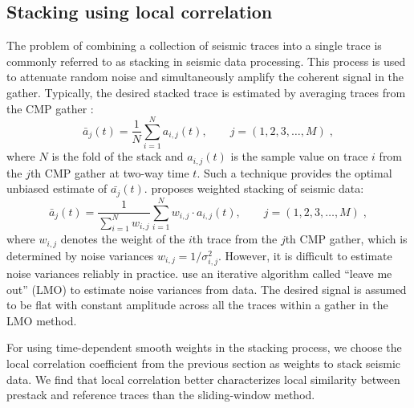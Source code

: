 \subsection{Stacking using local correlation}

The problem of combining a collection of seismic traces into a
single trace is commonly referred to as stacking in seismic data processing.
This process is used to attenuate random noise and simultaneously
amplify the coherent signal in the gather. Typically, the desired
stacked trace is estimated by averaging traces from the CMP
gather \cite[]{Mayne62}:
      \begin{equation}
          \bar{a}_j(t) = \frac{1}{N}\displaystyle\sum_{i=1}^{N} a_{i,j}(t), \qquad j=(1,2,3,\dots,M) \;,
        \label{eq:eq8}
      \end{equation}
where $N$ is the fold of the stack and $a_{i,j}(t)$ is the sample value on 
trace $i$ from the $j$th CMP gather at two-way time $t$. Such a technique 
provides the optimal unbiased estimate of $\bar{a_j}(t)$. \cite{Robinson70} 
proposes weighted stacking of seismic data:
      \begin{equation}
          \bar{a}_j(t) = \frac{1}{\displaystyle\sum_{i=1}^{N} w_{i,j}}\displaystyle\sum_{i=1}^{N} w_{i,j} \cdot a_{i,j}(t), \qquad j=(1,2,3,\dots,M) \;,
        \label{eq:eq9}
      \end{equation}
where $w_{i,j}$ denotes the weight of the $i$th trace from the $j$th CMP gather,
which is determined by noise variances $w_{i,j}=1/\sigma^2_{i,j}$. However, it
is difficult to estimate noise variances reliably in practice. 
\cite{Neelamani06} use an iterative algorithm called ``leave me out'' (LMO) to 
estimate noise variances from data. The desired signal is assumed to be flat 
with constant amplitude across all the traces within a gather in the LMO method.

For using time-dependent smooth weights in the stacking process, we choose the 
local correlation coefficient from the previous section as weights to stack 
seismic data. We find that local correlation better characterizes local 
similarity between prestack and reference traces than the sliding-window 
method.

